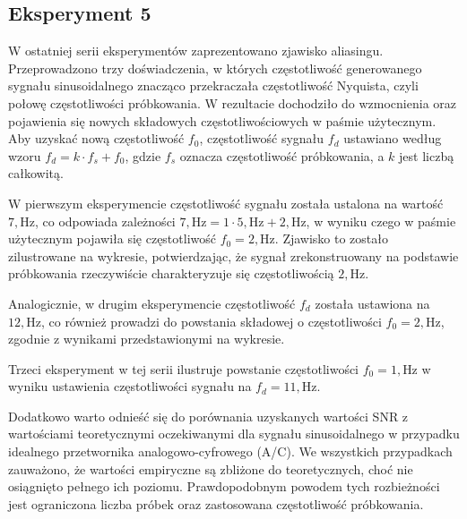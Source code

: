 \documentclass{article}
\begin{document}
    \subsection{Eksperyment 5}
    W ostatniej serii eksperymentów zaprezentowano zjawisko aliasingu. Przeprowadzono trzy doświadczenia,
    w których częstotliwość generowanego sygnału sinusoidalnego znacząco przekraczała częstotliwość Nyquista,
    czyli połowę częstotliwości próbkowania. W rezultacie dochodziło do wzmocnienia oraz pojawienia się 
    nowych składowych częstotliwościowych w paśmie użytecznym. Aby uzyskać nową częstotliwość $f_0$,
    częstotliwość sygnału $f_d$ ustawiano według wzoru $f_d = k \cdot f_s + f_0$, gdzie $f_s$ oznacza 
    częstotliwość próbkowania, a $k$ jest liczbą całkowitą.

    W pierwszym eksperymencie częstotliwość sygnału została ustalona na wartość $7,\text{Hz}$, 
    co odpowiada zależności $7,\text{Hz} = 1 \cdot 5,\text{Hz} + 2,\text{Hz}$, w wyniku czego w paśmie 
    użytecznym pojawiła się częstotliwość $f_0 = 2,\text{Hz}$. Zjawisko to zostało zilustrowane na wykresie, 
    potwierdzając, że sygnał zrekonstruowany na podstawie próbkowania rzeczywiście charakteryzuje się 
    częstotliwością $2,\text{Hz}$.

    Analogicznie, w drugim eksperymencie częstotliwość $f_d$ została ustawiona na $12,\text{Hz}$, 
    co również prowadzi do powstania składowej o częstotliwości $f_0 = 2,\text{Hz}$, zgodnie z wynikami 
    przedstawionymi na wykresie.

    Trzeci eksperyment w tej serii ilustruje powstanie częstotliwości $f_0 = 1,\text{Hz}$ w wyniku 
    ustawienia częstotliwości sygnału na $f_d = 11,\text{Hz}$.

Dodatkowo warto odnieść się do porównania uzyskanych wartości SNR z wartościami teoretycznymi oczekiwanymi dla sygnału sinusoidalnego w przypadku idealnego przetwornika analogowo-cyfrowego (A/C). We wszystkich przypadkach zauważono, że wartości empiryczne są zbliżone do teoretycznych, choć nie osiągnięto pełnego ich poziomu. Prawdopodobnym powodem tych rozbieżności jest ograniczona liczba próbek oraz zastosowana częstotliwość próbkowania.
\end{document}
